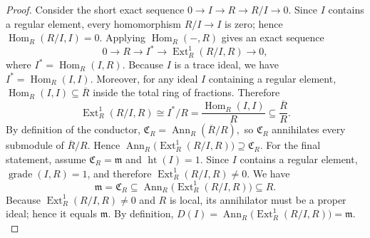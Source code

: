 \documentclass[10pt,a4paper]{amsart}
\DeclareMathOperator{\Ann}{Ann}\DeclareMathOperator{\ann}{Ann}
\DeclareMathOperator{\Ext}{Ext}
\DeclareMathOperator{\Hom}{Hom}
\DeclareMathOperator{\Ht}{ht}
\DeclareMathOperator{\grade}{grade}
\begin{document}
\begin{proof}
	Consider the short exact sequence
	\(
	0 \longrightarrow I \longrightarrow R \longrightarrow R/I \longrightarrow 0.
	\)
	Since $I$ contains a regular element, every homomorphism $R/I \to I$ is zero; hence
	\(
	\Hom_R(R/I,I)=0.
	\)
	Applying $\Hom_R(-,R)$ gives an exact sequence
	\[
	0 \longrightarrow R \longrightarrow I^\ast \longrightarrow \Ext^1_R(R/I,R) \longrightarrow 0,
	\]
	where $I^\ast=\Hom_R(I,R)$.
Because $I$ is a trace ideal, we have $I^\ast=\Hom_R(I,I)$. Moreover, for any ideal $I$ containing a regular element,
	\(
	\Hom_R(I,I)\subseteq \overline{R}
	\)
	inside the total ring of fractions. Therefore
	\[
	\Ext^1_R(R/I,R)\cong I^\ast/R
	= \frac{\Hom_R(I,I)}{R}
	\subseteq \frac{\overline{R}}{R}.
	\]
	By definition of the conductor,
	\(
	\mathfrak{C}_R = \Ann_R(\overline{R}/R),
	\)
	so $\mathfrak{C}_R$ annihilates every submodule of $\overline{R}/R$. Hence
	\(
	\Ann_R\!\big(\Ext^1_R(R/I,R)\big) \supseteq \mathfrak{C}_R.
	\)
For the final statement, assume $\mathfrak{C}_R=\mathfrak{m}$ and $\Ht(I)=1$. Since $I$ contains a regular element, $\grade(I,R)=1$, and therefore
	$\Ext^1_R(R/I,R)\neq 0$. We have
	\[
	\mathfrak{m}=\mathfrak{C}_R \subseteq \Ann_R\!\big(\Ext^1_R(R/I,R)\big) \subseteq R.
	\]
	Because $\Ext^1_R(R/I,R)\neq 0$ and $R$ is local, its annihilator must be a proper ideal; hence it equals $\mathfrak{m}$. By definition,
	\(
	D(I)=\Ann_R\!\big(\Ext^1_R(R/I,R)\big)=\mathfrak{m}.
	\)
\end{proof}
\end{document}
